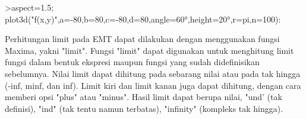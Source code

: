 \documentclass[a4paper,10pt]{article}
\begin{document}
\begin{eulernotebook}
\begin{eulercomment}
\begin{eulercomment}
\begin{eulerprompt}
>aspect=1.5; plot3d("f(x,y)",a=-80,b=80,c=-80,d=80,angle=60°,height=20°,r=pi,n=100):
\end{eulerprompt}
\begin{eulercomment}
Perhitungan limit pada EMT dapat dilakukan dengan menggunakan fungsi Maxima, yakni "limit".
Fungsi "limit" dapat digunakan untuk menghitung limit fungsi dalam bentuk ekspresi maupun
fungsi yang sudah didefinisikan sebelumnya. Nilai limit dapat dihitung pada sebarang nilai
atau pada tak hingga (-inf, minf, dan inf). Limit kiri dan limit kanan juga dapat dihitung,
dengan cara memberi opsi "plus" atau "minus". Hasil limit dapat berupa nilai, "und' (tak
definisi), "ind" (tak tentu namun terbatas), "infinity" (kompleks tak hingga).


\end{eulercomment}
\end{eulercomment}
\end{eulercomment}
\end{eulernotebook}
\end{document}
